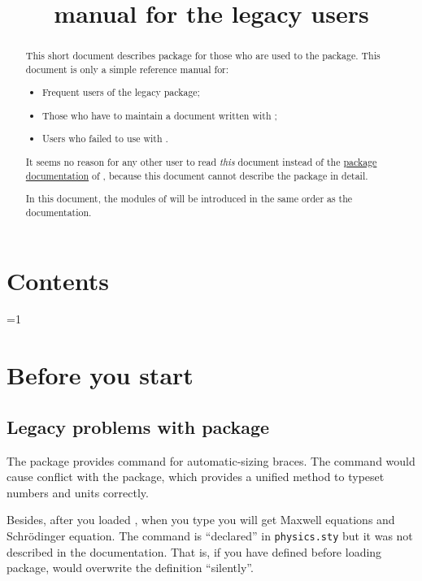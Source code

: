 \documentclass[11pt,letterpaper]{article}
\title{\pkg{physics2} manual for the legacy \pkg{physics} users}
\begin{document}
\maketitle

\begin{abstract}
This short document describes  package for those who are
used to the  package. This document is only a simple reference
manual for:
\begin{itemize}
\item Frequent users of the legacy  package;
\item Those who have to maintain a document written with ;
\item Users who failed to use  with .
\end{itemize}
It seems no reason for any other user to read \emph{this} document instead of
the \hyperref{./physics2.pdf}{}{}{package documentation} of ,
because this document cannot describe the package in detail.

In this document, the modules of  will be introduced in
the same order as the  documentation.
\end{abstract}

\section*{Contents}
\begin{multicols}{2}
\contentsonly
\end{multicols}
\ifnum\value{page}=1 \vfil\clearpage\fi

\section{Before you start}
\subsection{Legacy problems with  package}
\label{subsec:physics-legacy-problems}
The  package provides  command for automatic-sizing
braces. The  command would cause conflict with the 
package, which provides a unified method to typeset numbers and units
correctly.

Besides, after you loaded , when you type  you
will get Maxwell equations and Schrödinger equation. The 
command is ``declared'' in \texttt{physics.sty} but it was not described
in the documentation. That is, if you have defined  before
loading  package,  would overwrite the definition
``silently''.
\end{document}
